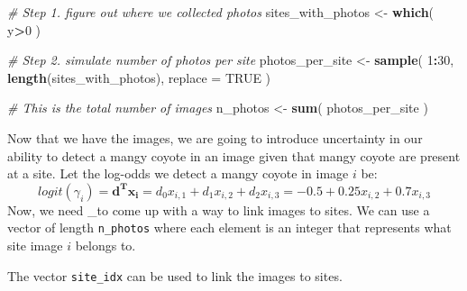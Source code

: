 \documentclass[
]{article}
\newenvironment{Shaded}{\begin{snugshade}}{\end{snugshade}}
\newcommand{\CommentTok}[1]{\textcolor[rgb]{0.56,0.35,0.01}{\textit{#1}}}
\newcommand{\DataTypeTok}[1]{\textcolor[rgb]{0.13,0.29,0.53}{#1}}
\newcommand{\DecValTok}[1]{\textcolor[rgb]{0.00,0.00,0.81}{#1}}
\newcommand{\KeywordTok}[1]{\textcolor[rgb]{0.13,0.29,0.53}{\textbf{#1}}}
\newcommand{\NormalTok}[1]{#1}
\newcommand{\OperatorTok}[1]{\textcolor[rgb]{0.81,0.36,0.00}{\textbf{#1}}}
\newcommand{\OtherTok}[1]{\textcolor[rgb]{0.56,0.35,0.01}{#1}}
\newcommand{\StringTok}[1]{\textcolor[rgb]{0.31,0.60,0.02}{#1}}
\begin{document}
\begin{Shaded}
\begin{Highlighting}[]
\CommentTok{# Step 1. figure out where we collected photos}
\NormalTok{sites_with_photos <-}\StringTok{ }\KeywordTok{which}\NormalTok{(}
\NormalTok{  y}\OperatorTok{>}\DecValTok{0}
\NormalTok{)}

\CommentTok{# Step 2. simulate number of photos per site}
\NormalTok{photos_per_site <-}\StringTok{ }\KeywordTok{sample}\NormalTok{(}
  \DecValTok{1}\OperatorTok{:}\DecValTok{30}\NormalTok{,}
  \KeywordTok{length}\NormalTok{(sites_with_photos),}
  \DataTypeTok{replace =} \OtherTok{TRUE}
\NormalTok{)}

\CommentTok{# This is the total number of images}
\NormalTok{n_photos <-}\StringTok{ }\KeywordTok{sum}\NormalTok{(}
\NormalTok{  photos_per_site}
\NormalTok{)}
\end{Highlighting}
\end{Shaded}

Now that we have the images, we are going to introduce uncertainty in
our ability to detect a mangy coyote in an image given that mangy coyote
are present at a site. Let the log-odds we detect a mangy coyote in
image \(i\) be:\\
\[logit(\gamma_i) = \bm{d^T x_i} = d_0 x_{i,1} + d_1 x_{i,2} + d_2 x_{i,3}= -0.5 + 0.25 x_{i,2} + 0.7 x_{i,3}\]
Now, we need \_to come up with a way to link images to sites. We can use
a vector of length \texttt{n\_photos} where each element is an integer
that represents what site image \(i\) belongs to.

\begin{Shaded}
\end{Shaded}

The vector \texttt{site\_idx} can be used to link the images to sites.\\
\end{document}
